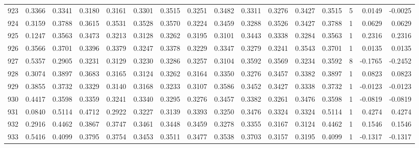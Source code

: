 \begin{tabular}{lrrrrrrrrrrrrrrr}
923 &      0.3366 &  0.3341 &  0.3180 &  0.3161 &  0.3301 &  0.3515 &  0.3251 &  0.3482 &  0.3311 &  0.3276 &   0.3427 &     0.3515 &      5 &                    0.0149 &                    -0.0025 \\
924 &      0.3159 &  0.3788 &  0.3615 &  0.3531 &  0.3528 &  0.3570 &  0.3224 &  0.3459 &  0.3288 &  0.3526 &   0.3427 &     0.3788 &      1 &                    0.0629 &                     0.0629 \\
925 &      0.1247 &  0.3563 &  0.3473 &  0.3213 &  0.3128 &  0.3262 &  0.3195 &  0.3101 &  0.3443 &  0.3338 &   0.3284 &     0.3563 &      1 &                    0.2316 &                     0.2316 \\
926 &      0.3566 &  0.3701 &  0.3396 &  0.3379 &  0.3247 &  0.3378 &  0.3229 &  0.3347 &  0.3279 &  0.3241 &   0.3543 &     0.3701 &      1 &                    0.0135 &                     0.0135 \\
927 &      0.5357 &  0.2905 &  0.3231 &  0.3129 &  0.3230 &  0.3286 &  0.3257 &  0.3104 &  0.3592 &  0.3569 &   0.3234 &     0.3592 &      8 &                   -0.1765 &                    -0.2452 \\
928 &      0.3074 &  0.3897 &  0.3683 &  0.3165 &  0.3124 &  0.3262 &  0.3164 &  0.3350 &  0.3276 &  0.3457 &   0.3382 &     0.3897 &      1 &                    0.0823 &                     0.0823 \\
929 &      0.3855 &  0.3732 &  0.3329 &  0.3140 &  0.3168 &  0.3233 &  0.3107 &  0.3586 &  0.3452 &  0.3427 &   0.3338 &     0.3732 &      1 &                   -0.0123 &                    -0.0123 \\
930 &      0.4417 &  0.3598 &  0.3359 &  0.3241 &  0.3340 &  0.3295 &  0.3276 &  0.3457 &  0.3382 &  0.3261 &   0.3476 &     0.3598 &      1 &                   -0.0819 &                    -0.0819 \\
931 &      0.0840 &  0.5114 &  0.4712 &  0.2922 &  0.3227 &  0.3139 &  0.3393 &  0.3250 &  0.3476 &  0.3324 &   0.3324 &     0.5114 &      1 &                    0.4274 &                     0.4274 \\
932 &      0.2916 &  0.4462 &  0.3867 &  0.3747 &  0.3461 &  0.3448 &  0.3459 &  0.3278 &  0.3355 &  0.3167 &   0.3124 &     0.4462 &      1 &                    0.1546 &                     0.1546 \\
933 &      0.5416 &  0.4099 &  0.3795 &  0.3754 &  0.3453 &  0.3511 &  0.3477 &  0.3538 &  0.3703 &  0.3157 &   0.3195 &     0.4099 &      1 &                   -0.1317 &                    -0.1317 \\

\end{tabular}
